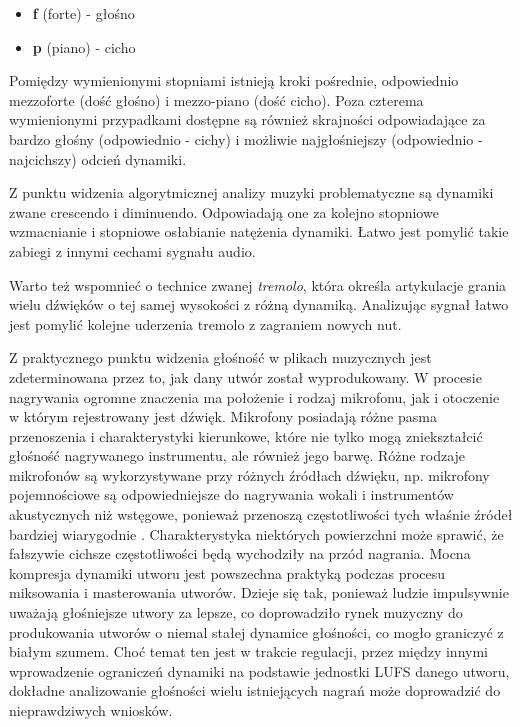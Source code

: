 \documentclass[12pt,a4paper,twoside]{mwart}
\begin{document}
\begin{itemize}
  \item \textbf{f} (forte) - głośno
  \item \textbf{p} (piano) - cicho
\end{itemize}

Pomiędzy wymienionymi stopniami istnieją kroki pośrednie, odpowiednio mezzo\-forte (dość głośno) i mezzo-piano (dość cicho). Poza czterema wymienionymi przypadkami dostępne są również skrajności odpowiadające za bardzo głośny (odpowiednio - cichy) i możliwie najgłośniejszy (odpowiednio - najcichszy) odcień dynamiki.

Z punktu widzenia algorytmicznej analizy muzyki problematyczne są dynamiki zwane crescendo i diminuendo. Odpowiadają one za kolejno stopniowe wzmacnianie i stopniowe osłabianie natężenia dynamiki. Łatwo jest pomylić takie zabiegi z innymi cechami sygnału audio.

Warto też wspomnieć o technice zwanej \textit{tremolo}, która określa artykulacje  grania wielu dźwięków o tej samej wysokości z różną dynamiką. Analizując sygnał łatwo jest pomylić kolejne uderzenia tremolo z zagraniem nowych nut.

Z praktycznego punktu widzenia głośność w plikach muzycznych jest zdeterminowana przez to, jak dany utwór został wyprodukowany. W procesie nagrywania ogromne znaczenia ma położenie i rodzaj mikrofonu, jak i otoczenie w którym rejestrowany jest dźwięk. Mikrofony posiadają różne pasma przenoszenia i charakterystyki kierunkowe, które nie tylko mogą zniekształcić głośność nagrywanego instrumentu, ale również jego barwę. Różne rodzaje mikrofonów są wykorzystywane przy różnych źródłach dźwięku, np. mikrofony pojemnościowe są odpowiedniejsze do nagrywania wokali i instrumentów akustycznych niż wstęgowe, ponieważ przenoszą częstotliwości tych właśnie źródeł bardziej wiarygodnie 
\cite[48-52]{Homerecording:DlaKazdego}
. Charakterystyka niektórych powierzchni może sprawić, że fałszywie cichsze częstotliwości będą wychodziły na przód nagrania. Mocna kompresja dynamiki utworu jest powszechna praktyką podczas procesu miksowania i masterowania utworów. Dzieje się tak, ponieważ ludzie impulsywnie uważają głośniejsze utwory za lepsze, co doprowadziło rynek muzyczny do produkowania utworów o niemal stałej dynamice głośności, co mogło graniczyć z białym szumem. Choć temat ten jest w trakcie regulacji, przez między innymi wprowadzenie ograniczeń dynamiki na podstawie jednostki LUFS danego utworu, dokładne analizowanie głośności wielu istniejących nagrań może doprowadzić do nieprawdziwych wniosków.
\end{document}
